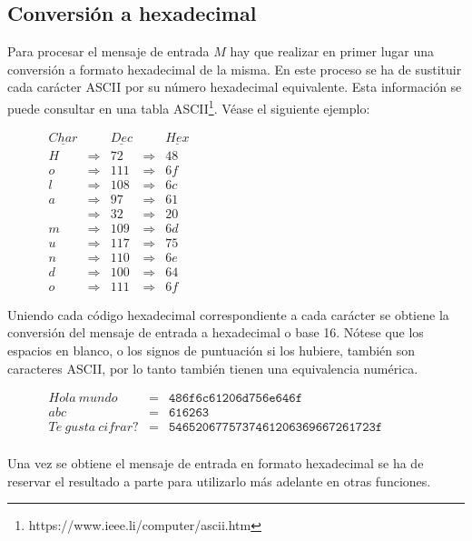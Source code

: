 \documentclass{article}
\begin{document}
    \subsection{Conversión a hexadecimal}
        Para procesar el mensaje de entrada $M$ hay que realizar en primer lugar una conversión a formato hexadecimal de la misma. En este proceso se ha de sustituir cada carácter ASCII por su número hexadecimal equivalente. Esta información se puede consultar en una tabla ASCII\footnote{https://www.ieee.li/computer/ascii.htm}. Véase el siguiente ejemplo:
            \begin{figure}[H]
            \centering
                $\begin{array}{lclcl}
                \underline{Char} &  & \underline{Dec} &  & \underline{Hex} \\
                H & \Rightarrow & 72 & \Rightarrow & 48 \\
                o & \Rightarrow & 111 & \Rightarrow & 6f \\
                l & \Rightarrow & 108 & \Rightarrow & 6c \\
                a & \Rightarrow & 97 & \Rightarrow & 61 \\
                  & \Rightarrow & 32 & \Rightarrow & 20 \\
                m & \Rightarrow & 109 & \Rightarrow & 6d \\
                u & \Rightarrow & 117 & \Rightarrow & 75 \\
                n & \Rightarrow & 110 & \Rightarrow & 6e \\
                d & \Rightarrow & 100 & \Rightarrow & 64 \\
                o & \Rightarrow & 111 & \Rightarrow & 6f
                \end{array}$
            \end{figure}
        Uniendo cada código hexadecimal correspondiente a cada carácter se obtiene la conversión del mensaje de entrada a hexadecimal o base 16. Nótese que los espacios en blanco, o los signos de puntuación si los hubiere, también son caracteres ASCII, por lo tanto también tienen una equivalencia numérica.
            \begin{figure}[H]
            \centering
                $\begin{array}{rcl}
                    Hola \ mundo & = & \texttt{486f6c61206d756e646f} \\
                    abc & = & \texttt{616263} \\
                    Te \ gusta \ cifrar? & = & \texttt{5465206775737461206369667261723f} \\
                \end{array}$
            \end{figure}
        Una vez se obtiene el mensaje de entrada en formato hexadecimal se ha de reservar el resultado a parte para utilizarlo más adelante en otras funciones.
\end{document}
